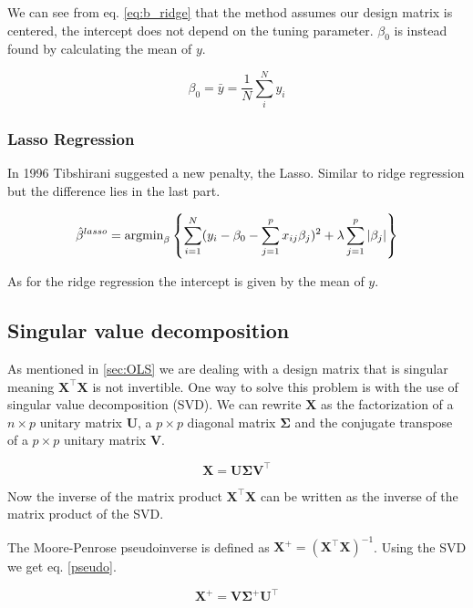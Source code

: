 \documentclass[a4paper,12pt, english]{article}
\begin{document}
We can see from eq. \ref{eq:b_ridge} that the method assumes our design matrix is centered, the intercept does not depend on the tuning parameter. $\beta_0$ is instead found by calculating the mean of $y$.

\begin{equation} \label{y_mean}
\beta_0 = \bar{y} = \frac{1}{N} \sum_i^N y_i
\end{equation}

\subsubsection{Lasso Regression}

In 1996 Tibshirani suggested a new penalty, the Lasso. Similar to ridge regression but the difference lies in the last part.  

\begin{equation*}
\hat{\beta}^{lasso} = \textnormal{argmin}_{\beta} \left \{ \sum_{i=1}^{N} (y_i - \beta_0 - \sum_{j=1}^{p} x_{ij} \beta_j)^2 + \lambda \sum_{j=1}^{p} |\beta_j| \right \}
\end{equation*}

As for the ridge regression the intercept is given by the mean of $y$.

\subsection{Singular value decomposition}

As mentioned in \ref{sec:OLS} we are dealing with a design matrix that is singular meaning $\mathbf{X}^{\top}\mathbf{X}$ is not invertible. One way to solve this problem is with the use of singular value decomposition (SVD). We can rewrite $\mathbf{X}$ as the factorization of a $n \times p$ unitary matrix $\mathbf{U}$, a $p \times p$ diagonal matrix $\mathbf{\Sigma}$ and the conjugate transpose of a $p \times p$ unitary matrix $\mathbf{V}$.

\begin{equation*} 
\mathbf{X} = \mathbf{U} \mathbf{\Sigma} \mathbf{V}^\top
\end{equation*}

Now the inverse of the matrix product $\mathbf{X}^{\top}\mathbf{X}$ can be written as the inverse of the matrix product of the SVD.

The Moore-Penrose pseudoinverse is defined as $\mathbf{X}^+ = (\mathbf{X}^{\top}\mathbf{X})^{-1}$. Using the SVD we get eq. \ref{pseudo}.

\begin{equation} \label{pseudo}
\mathbf{X}^+ = \mathbf{V} \mathbf{\Sigma}^+ \mathbf{U}^\top 
\end{equation}
\end{document}
